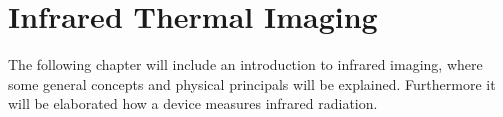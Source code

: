\chapter{Infrared Thermal Imaging}

The following chapter will include an introduction to infrared imaging, where some general concepts and physical principals will be explained. Furthermore it will be elaborated how a device measures infrared radiation. 